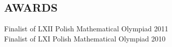 \documentclass[margin, 10pt]{res} %
\begin{document}
\begin{resume}
\section{ AWARDS } 

Finalist of LXII Polish Mathematical Olympiad \hfill 2011 \\
Finalist of LXI Polish Mathematical Olympiad \hfill 2010





\end{resume}
\end{document}
